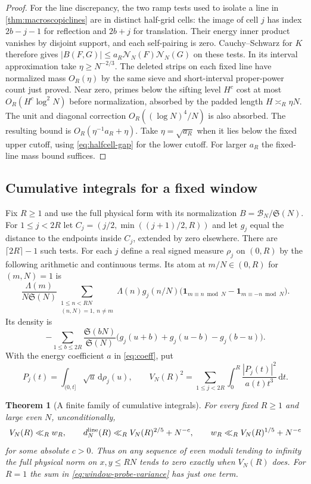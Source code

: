\documentclass[11pt,a4paper]{article}
\numberwithin{equation}{section}
\newtheorem{theorem}{Theorem}[section]
\newcommand{\SSS}{\mathfrak S}
\newcommand{\ud}{\mathrm d}
\newcommand{\B}{\mathcal B_N}
\newcommand{\NN}{\mathcal N_N}
\begin{document}
\begin{proof}
For the line discrepancy, the two ramp tests used to isolate a
line in \cref{thm:macroscopiclines} are in distinct half-grid
cells: the image of cell $j$ has index $2b-j-1$ for reflection
and $2b+j$ for translation. Their energy inner product vanishes
by disjoint support, and each self-pairing is zero. Cauchy--Schwarz
for $K$ therefore gives $|B(F,G)|\le a_R\NN(F)\NN(G)$ on these
tests. In its interval approximation take $\eta\ge N^{-2/3}$.
The deleted strips on each fixed line have normalized mass
$O_R(\eta)$ by the same sieve and short-interval proper-power
count just proved. Near zero, primes below the sifting level
$H^c$ cost at most $O_R(H^c\log^2 N)$ before normalization,
absorbed by the padded length $H\asymp_R\eta N$. The unit and
diagonal correction $O_R((\log N)^4/N)$ is also absorbed.
The resulting bound is $O_R(\eta^{-1}a_R+\eta)$.
Take $\eta=\sqrt{a_R}$ when it lies below the fixed upper
cutoff, using \eqref{eq:halfcell-gap} for the lower cutoff.
For larger $a_R$ the fixed-line mass bound suffices.
\end{proof}

\subsection{Cumulative integrals for a fixed window}

Fix $R\ge1$ and use the full physical form with its normalization
$B=\B/\SSS(N)$. For $1\le j<2R$ let
$C_j=(j/2,\min((j+1)/2,R))$ and let $g_j$ equal the distance
to the endpoints inside $C_j$, extended by zero elsewhere.
There are $\lceil2R\rceil-1$ such tests. For each $j$ define a
real signed measure $\rho_j$ on $(0,R)$ by the following arithmetic
and continuous terms. Its atom at $m/N\in(0,R)$ for $(m,N)=1$ is
\[
 \frac{\Lambda(m)}{N\SSS(N)}
 \sum_{\substack{1\le n<RN\\(n,N)=1,\ n\ne m}}
 \Lambda(n)g_j(n/N)
 \bigl(\mathbf1_{m\equiv n\bmod N}-\mathbf1_{m\equiv-n\bmod N}\bigr).
\]
Its density is
\[
 -\sum_{1\le b\le2R}\frac{\SSS(bN)}{\SSS(N)}
       \bigl(g_j(u+b)+g_j(u-b)-g_j(b-u)\bigr).
\]
With the energy coefficient $a$ in \cref{eq:coeff}, put
\begin{equation}
 P_j(t)=\int_{(0,t]}\sqrt u\,\ud\rho_j(u),\qquad
 V_N(R)^2=\sum_{1\le j<2R}\int_0^R
                  \frac{|P_j(t)|^2}{a(t)t^3}\,\ud t .
 \label{eq:window-probe-variance}
\end{equation}

\begin{theorem}[A finite family of cumulative integrals]
\label{thm:window-probe-variance}
For every fixed $R\ge1$ and large even $N$, unconditionally,
\[
 V_N(R)\ll_R w_R,\qquad
 d_N^{\rm line}(R)\ll_R V_N(R)^{2/5}+N^{-c},\qquad
 w_R\ll_R V_N(R)^{1/5}+N^{-c}
\]
for some absolute $c>0$. Thus on any sequence of even moduli
tending to infinity the full physical norm on $x,y\le RN$
tends to zero exactly when $V_N(R)$ does. For $R=1$ the sum
in \cref{eq:window-probe-variance} has just one term.
\end{theorem}
\end{document}
